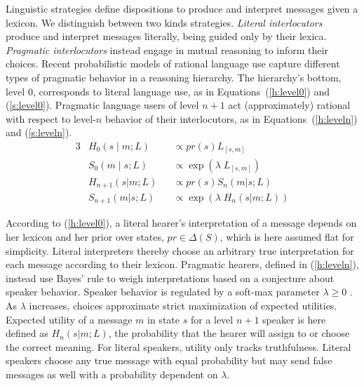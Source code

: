 \documentclass[a4paper, 11pt]{article}
\theoremstyle{Satz}
\newcommand{\state}{\ensuremath{s}\xspace}		%
\newcommand{\messg}{\ensuremath{m}\xspace}		%
\begin{document}
Linguistic strategies define dispositions to produce and interpret messages given a lexicon. We
distinguish between two kinds strategies. {\em Literal interlocutors} produce and
interpret messages literally, being guided only by their lexica. {\em Pragmatic interlocutors}
instead engage in mutual reasoning to inform their choices. Recent probabilistic models of
rational language use
\citep{frank+goodman:2012,FrankeJager2015:Probabilistic-p,GoodmanFrank2016:Pragmatic-Langu}
capture different types of pragmatic behavior in a reasoning hierarchy. The hierarchy's bottom,
level $0$, corresponds to literal language use, as in Equations~(\ref{h:level0}) and
(\ref{s:level0}). Pragmatic language users of level $n + 1$ act (approximately) rational with
respect to level-$n$ behavior of their interlocutors, as in Equations~(\ref{h:leveln}) and
(\ref{s:leveln}).
\begin{alignat}{3}
&H_{0}(s \mid m;L) &&\propto pr(s) L_{[s,m]} \label{h:level0}\\
&S_{0}(m \mid s;L) &&\propto \exp(\lambda \; L_{[s,m]}) \label{s:level0}\\
&H_{n+1}(s|m;L) &&\propto pr(s) S_{n}(m|s;L) \label{h:leveln}\\
&S_{n+1}(m|s;L) &&\propto  \exp(\lambda \; H_{n}(s|m;L)) \label{s:leveln}
\end{alignat}

According to (\ref{h:level0}), a literal hearer's interpretation of a message depends on her
lexicon and her prior over states, $pr \in \Delta(S)$, which is here assumed flat for
simplicity. Literal interpreters thereby choose an arbitrary true interpretation for each
message according to their lexicon. Pragmatic hearers, defined in (\ref{h:leveln}), instead use Bayes' rule to weigh
interpretations based on a conjecture about speaker behavior. Speaker behavior is regulated by
a soft-max parameter $\lambda \geq 0$ \citep{luce:1959,sutton+barto:1998}. As
$\lambda$ increases, choices approximate strict maximization of expected utilities. Expected
utility of a message $\messg$ in state $\state$ for a level $n+1$ speaker is here defined as
$H_{n}(s|m;L)$, the probability that the hearer will assign to or choose the correct
meaning. For literal speakers, utility only tracks truthfulness. Literal speakers choose any
true message with equal probability but may send false messages as well with a probability
dependent on $\lambda$.
\end{document}
